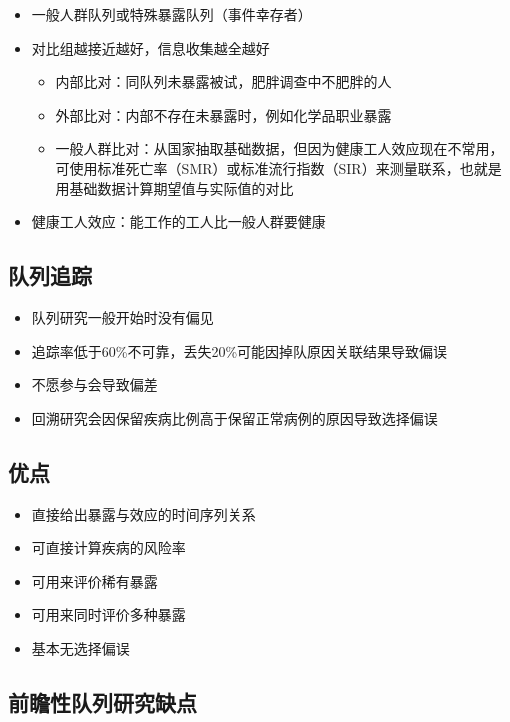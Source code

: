\documentclass[]{book}
\providecommand{\tightlist}{%
  \setlength{\itemsep}{0pt}\setlength{\parskip}{0pt}}
\begin{document}
\begin{itemize}
\tightlist
\item
  一般人群队列或特殊暴露队列（事件幸存者）
\item
  对比组越接近越好，信息收集越全越好

  \begin{itemize}
  \tightlist
  \item
    内部比对：同队列未暴露被试，肥胖调查中不肥胖的人
  \item
    外部比对：内部不存在未暴露时，例如化学品职业暴露
  \item
    一般人群比对：从国家抽取基础数据，但因为健康工人效应现在不常用，可使用标准死亡率（SMR）或标准流行指数（SIR）来测量联系，也就是用基础数据计算期望值与实际值的对比
  \end{itemize}
\item
  健康工人效应：能工作的工人比一般人群要健康
\end{itemize}

\subsection{队列追踪}

\begin{itemize}
\tightlist
\item
  队列研究一般开始时没有偏见
\item
  追踪率低于60\%不可靠，丢失20\%可能因掉队原因关联结果导致偏误
\item
  不愿参与会导致偏差
\item
  回溯研究会因保留疾病比例高于保留正常病例的原因导致选择偏误
\end{itemize}

\subsection{优点}

\begin{itemize}
\tightlist
\item
  直接给出暴露与效应的时间序列关系
\item
  可直接计算疾病的风险率
\item
  可用来评价稀有暴露
\item
  可用来同时评价多种暴露
\item
  基本无选择偏误
\end{itemize}

\subsection{前瞻性队列研究缺点}
\end{document}
